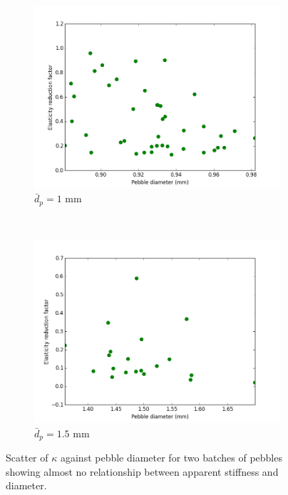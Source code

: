 \begin{figure}
        \centering
        \begin{subfigure}[b]{\doubleimagewidth}
                \includegraphics[width=\textwidth]{chapters/figures/nfri-1mm-kappa-dp-scatter.png}
                \caption{$\bar{d}_p = 1$ mm}
                \label{fig:nfri-1mm-kappa-dp-scatter}
        \end{subfigure}
        ~
        \begin{subfigure}[b]{\doubleimagewidth}
                \includegraphics[width=\textwidth]{chapters/figures/nfri-1.5mm-kappa-dp-scatter.png}
                \caption{$\bar{d}_p = 1.5$ mm}
                \label{fig:nfri-1.5mm-kappa-dp-scatter}
        \end{subfigure}
        \caption{Scatter of $\kappa$ against pebble diameter for two batches of \lit pebbles showing almost no relationship between apparent stiffness and diameter.}\label{fig:nfri-kappa-dp-scatter}
\end{figure}






